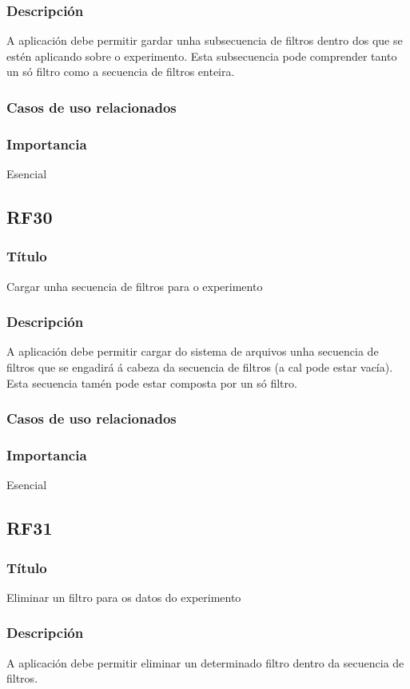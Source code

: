 \subsubsection{Descripción}
A aplicación debe permitir gardar unha subsecuencia de filtros dentro dos que se estén aplicando sobre o experimento. Esta subsecuencia pode comprender tanto un só filtro como a secuencia de filtros enteira.
\subsubsection{Casos de uso relacionados}
\subsubsection{Importancia}
Esencial

\subsection{RF30}
\subsubsection{Título}
Cargar unha secuencia de filtros para o experimento
\subsubsection{Descripción}
A aplicación debe permitir cargar do sistema de arquivos unha secuencia de filtros que se engadirá á cabeza da secuencia de filtros (a cal pode estar vacía). Esta secuencia tamén pode estar composta por un só filtro.
\subsubsection{Casos de uso relacionados}
\subsubsection{Importancia}
Esencial

\subsection{RF31}
\subsubsection{Título}
Eliminar un filtro para os datos do experimento
\subsubsection{Descripción}
A aplicación debe permitir eliminar un determinado filtro dentro da secuencia de filtros.
